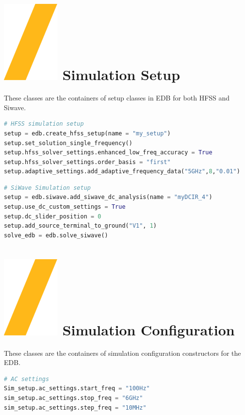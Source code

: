 \documentclass[landscape]{article}
\begin{document}
\begin{multicols}{3}
\begin{lstlisting}[language=Python]
\end{lstlisting}

\section{\includegraphics[height=\fontcharht\font`\S]{slash.png} Simulation Setup}
These classes are the containers of setup classes in EDB for both HFSS and Siwave.
\begin{lstlisting}[language=Python]
# HFSS simulation setup
setup = edb.create_hfss_setup(name = "my_setup")
setup.set_solution_single_frequency()
setup.hfss_solver_settings.enhanced_low_freq_accuracy = True
setup.hfss_solver_settings.order_basis = "first"
setup.adaptive_settings.add_adaptive_frequency_data("5GHz",8,"0.01")
\end{lstlisting}

\begin{lstlisting}[language=Python]
# SiWave Simulation setup
setup = edb.siwave.add_siwave_dc_analysis(name = "myDCIR_4")
setup.use_dc_custom_settings = True
setup.dc_slider_position = 0
setup.add_source_terminal_to_ground("V1", 1)
solve_edb = edb.solve_siwave()
\end{lstlisting}
\section{\includegraphics[height=\fontcharht\font`\S]{slash.png} Simulation Configuration}
These classes are the containers of simulation configuration constructors for the EDB.
\begin{lstlisting}[language=Python]
# AC settings
Sim_setup.ac_settings.start_freq = "100Hz"
sim_setup.ac_settings.stop_freq = "6GHz"
sim_setup.ac_settings.step_freq = "10MHz"


\end{lstlisting}
\end{multicols}
\end{document}
